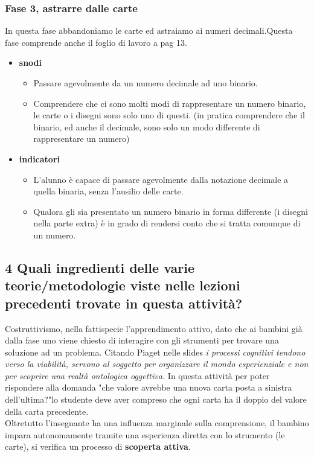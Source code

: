 \documentclass[a4paper]{article}
\begin{document}
\subsubsection{Fase 3, astrarre dalle carte}
In questa fase abbandoniamo le carte ed astraiamo ai numeri decimali.Questa fase comprende anche il foglio di lavoro a pag 13.
\begin{itemize}
	\item \textbf{snodi}
		\begin{itemize}[label={--}]
			\item Passare agevolmente da un numero decimale ad uno binario.
			\item Comprendere che ci sono molti modi di rappresentare un numero binario, le carte o i disegni sono solo uno di questi. (in pratica comprendere che il binario, ed anche il decimale, sono solo un modo differente di rappresentare un numero)
		\end{itemize}
	\item \textbf{indicatori}
		\begin{itemize}[label={--}]
			\item L'alunno è capace di passare agevolmente dalla notazione decimale a quella binaria, senza l'ausilio delle carte.
			\item Qualora gli sia presentato un numero binario in forma differente (i disegni nella parte extra) è in grado di rendersi conto che si tratta comunque di un numero.
		\end{itemize}
\end{itemize}
\subsection{4 Quali ingredienti delle varie teorie/metodologie viste nelle lezioni precedenti trovate in questa attività?}
Costruttivismo, nella fattispecie l'apprendimento attivo, dato che ai bambini già dalla fase uno viene chiesto di interagire con gli strumenti per trovare una soluzione ad un problema. Citando Piaget nelle slides \emph{i processi cognitivi tendono verso la viabilità, servono al soggetto per organizzare il mondo esperienziale e non per scoprire una realtà ontologica oggettiva.}
In questa attività per poter rispondere alla domanda "che valore avrebbe una nuova carta posta a sinistra dell'ultima?"lo studente deve aver compreso che ogni carta ha il doppio del valore della carta precedente.\\
Oltretutto l'insegnante ha una influenza marginale sulla comprensione, il bambino impara autonomamente tramite una esperienza diretta con lo strumento (le carte), si verifica un processo di \textbf{scoperta attiva}.\\
\end{document}
